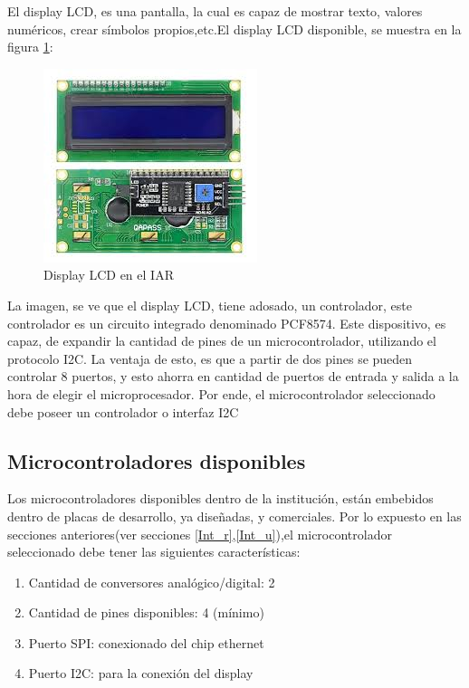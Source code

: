 El display LCD, es una pantalla, la cual es capaz de mostrar texto, valores numéricos, crear símbolos propios,etc.El display LCD disponible, se muestra en la figura \ref{fig:LCD_r}: 
\begin{figure}[ht]
	\centering
	\includegraphics{dispLCD} 
	\caption{Display LCD en el IAR}
	\label{fig:LCD_r}
\end{figure}

La imagen, se ve que el display LCD, tiene adosado, un controlador, este controlador es un circuito integrado denominado PCF8574. Este dispositivo, es capaz, de expandir la cantidad de pines de un microcontrolador, utilizando el protocolo I2C. La ventaja de esto, es que a partir de dos pines se pueden controlar 8 puertos, y esto ahorra en cantidad de puertos de entrada y salida a la hora de elegir el microprocesador. Por ende, el microcontrolador seleccionado debe poseer un controlador o interfaz I2C   



\subsection{Microcontroladores disponibles}  

Los microcontroladores disponibles dentro de la institución, están embebidos dentro de placas de desarrollo, ya diseñadas, y comerciales. Por lo expuesto en las secciones anteriores(ver secciones \ref{Int_r},\ref{Int_u}),el microcontrolador seleccionado debe tener las siguientes características:

\begin{enumerate}
	\item Cantidad de conversores analógico/digital: 2
	\item Cantidad de pines disponibles: 4 (mínimo) 
	\item Puerto SPI: conexionado del chip ethernet
	\item Puerto I2C: para la conexión del display 
\end{enumerate}


